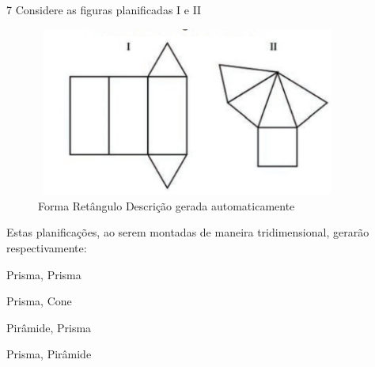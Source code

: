 \begin{escolha}
\begin{boxmedio}
\begin{boxmedio}
{\begin{boxpeq}
\begin{boxpeq}
{\begin{boxpeq}
\begin{boxmedio}
\begin{boxmedio}
\begin{boxpeq}
\begin{boxmedio}
\begin{boxpeq}
\begin{boxpeq}
\begin{boxpeq}
\begin{boxpeq}
\begin{boxmedio}
{\begin{boxmedio}
\begin{boxmedio}
\begin{boxpeq}
\begin{boxmedio}
\begin{boxpeq}
\begin{boxpeq}
\begin{boxpeq}
\begin{escolha}
{\begin{boxmedio}
\begin{boxpeq}
\begin{boxpeq}
\begin{boxpeq}
\begin{boxpeq}
\begin{boxpeq}
\begin{boxmedio}
\begin{boxpeq}
\begin{boxpeq}
\begin{boxpeq}
{\begin{boxpeq}
\begin{boxmedio}
\begin{boxpeq}
\begin{boxpeq}
\begin{boxpeq}
{\begin{boxpeq}
\begin{boxmedio}
{\begin{boxpeq}
\begin{boxpeq}
\begin{boxmedio}
\begin{boxmedio}
\begin{boxpeq}
\begin{boxpeq}
{\begin{boxpeq}
\begin{boxpeq}
\begin{boxpeq}
\begin{boxpeq}

\num{7} Considere as figuras planificadas I e II

\begin{figure}
\centering
\includegraphics[width=3.93333in,height=2.18333in]{./_SAEB_9_MAT/media/image169.png}
\caption  {Forma Retângulo Descrição gerada 
automaticamente}
\end{figure}


Estas planificações, ao serem montadas de maneira tridimensional,
gerarão respectivamente:

\begin{escolha}

  \item Prisma, Prisma

  \item Prisma, Cone

  \item Pirâmide, Prisma

  \item Prisma, Pirâmide


\end{escolha}
\end{boxpeq}
\end{boxpeq}
\end{boxpeq}
\end{boxpeq}}
\end{boxpeq}
\end{boxpeq}
\end{boxmedio}
\end{boxmedio}
\end{boxpeq}
\end{boxpeq}}
\end{boxmedio}
\end{boxpeq}}
\end{boxpeq}
\end{boxpeq}
\end{boxpeq}
\end{boxmedio}
\end{boxpeq}}
\end{boxpeq}
\end{boxpeq}
\end{boxpeq}
\end{boxmedio}
\end{boxpeq}
\end{boxpeq}
\end{boxpeq}
\end{boxpeq}
\end{boxpeq}
\end{boxmedio}}
\end{escolha}
\end{boxpeq}
\end{boxpeq}
\end{boxpeq}
\end{boxmedio}
\end{boxpeq}
\end{boxmedio}
\end{boxmedio}}
\end{boxmedio}
\end{boxpeq}
\end{boxpeq}
\end{boxpeq}
\end{boxpeq}
\end{boxmedio}
\end{boxpeq}
\end{boxmedio}
\end{boxmedio}
\end{boxpeq}}
\end{boxpeq}
\end{boxpeq}}
\end{boxmedio}
\end{boxmedio}
\end{escolha}
